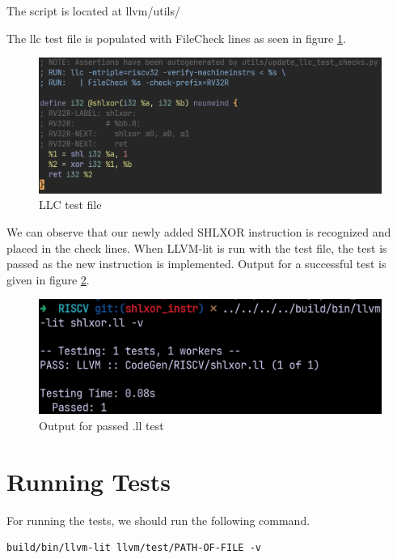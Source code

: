 The script is located at llvm/utils/

The llc test file is populated with FileCheck lines as seen in figure \ref{fig:llc_test_file}.
\begin{figure}
    \centering
    \includegraphics[scale=0.8]{testing/llc_test_file.png}
    \caption{LLC test file}
    \label{fig:llc_test_file}
\end{figure}

We can observe that our newly added SHLXOR instruction is recognized and placed in the check lines. When LLVM-lit is run with the test file, the test is passed as the new instruction is implemented. Output for a successful test is given in figure \ref{fig:output_for_passed_ll_test}.
\begin{figure}
    \centering
    \includegraphics{testing/output_for_passed_ll_test.png}
    \caption{Output for passed .ll test}
    \label{fig:output_for_passed_ll_test}
\end{figure}

\section{Running Tests}
For running the tests, we should run the following command.

\begin{lstlisting}
build/bin/llvm-lit llvm/test/PATH-OF-FILE -v
\end{lstlisting}
